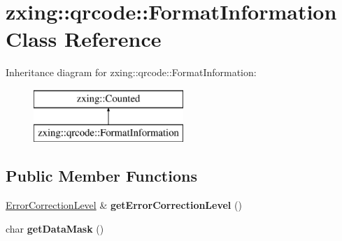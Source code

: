 \hypertarget{classzxing_1_1qrcode_1_1_format_information}{}\section{zxing\+:\+:qrcode\+:\+:Format\+Information Class Reference}
\label{classzxing_1_1qrcode_1_1_format_information}
Inheritance diagram for zxing\+:\+:qrcode\+:\+:Format\+Information\+:\begin{figure}[H]
\begin{center}
\leavevmode
\includegraphics[height=2.000000cm]{classzxing_1_1qrcode_1_1_format_information}
\end{center}
\end{figure}
\subsection*{Public Member Functions}
\begin{DoxyCompactItemize}
\item 
\mbox{\label{classzxing_1_1qrcode_1_1_format_information_ad35e5e468bd8c9f6b5fba7952a58e5a2}} 
\mbox{\hyperlink{classzxing_1_1qrcode_1_1_error_correction_level}{Error\+Correction\+Level}} \& {\bfseries get\+Error\+Correction\+Level} ()
\item 
\mbox{\label{classzxing_1_1qrcode_1_1_format_information_a90cf87aba7ded5bd52572db2908e44d0}} 
char {\bfseries get\+Data\+Mask} ()
\end{DoxyCompactItemize}
